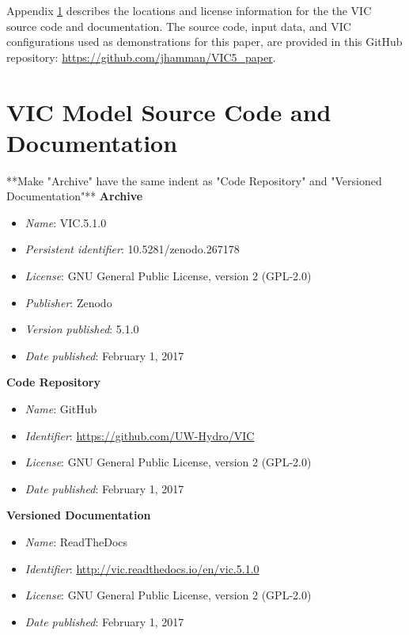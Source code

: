\documentclass[gmd, manuscript]{copernicus}
\begin{document}
  Appendix \ref{appendix:source_code} describes the locations and license information for the the VIC source code and documentation. The source code, input data, and VIC configurations used as demonstrations for this paper, are provided in this GitHub repository: \url{https://github.com/jhamman/VIC5_paper}.

\appendix
\section{VIC Model Source Code and Documentation}
\label{appendix:source_code}

**Make "Archive" have the same indent as "Code Repository" and "Versioned Documentation"**
{\bf Archive}

\begin{itemize}
	\item \textit{Name}: VIC.5.1.0
	\item \textit{Persistent identifier}: 10.5281/zenodo.267178
	\item \textit{License}: GNU General Public License, version 2 (GPL-2.0)
	\item \textit{Publisher}:  Zenodo
	\item \textit{Version published}: 5.1.0
	\item \textit{Date published}: February 1, 2017
\end{itemize}

{\bf Code Repository}

\begin{itemize}
	\item \textit{Name}: GitHub
	\item \textit{Identifier}: \url{https://github.com/UW-Hydro/VIC}
	\item \textit{License}: GNU General Public License, version 2 (GPL-2.0)
	\item \textit{Date published}: February 1, 2017
\end{itemize}

{\bf Versioned Documentation}

\begin{itemize}
	\item \textit{Name}: ReadTheDocs
	\item \textit{Identifier}: \url{http://vic.readthedocs.io/en/vic.5.1.0}
	\item \textit{License}: GNU General Public License, version 2 (GPL-2.0)
	\item \textit{Date published}: February 1, 2017
\end{itemize}
\end{document}
